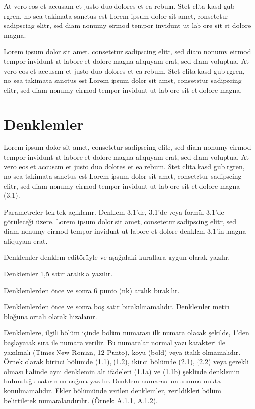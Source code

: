 At vero eos et accusam et justo duo dolores et ea rebum. Stet clita kasd gub rgren, no sea takimata sanctus est Lorem ipsum dolor sit amet, consetetur sadipscing elitr, sed diam nonumy eirmod tempor invidunt ut lab ore sit et dolore magna.

Lorem ipsum dolor sit amet, consetetur sadipscing elitr, sed diam nonumy eirmod tempor invidunt ut labore et dolore magna aliquyam erat, sed diam voluptua. At vero eos et accusam et justo duo dolores et ea rebum. Stet clita kasd gub rgren, no sea takimata sanctus est Lorem ipsum dolor sit amet, consetetur sadipscing elitr, sed diam nonumy eirmod tempor invidunt ut lab ore sit et dolore magna.

\section{Denklemler}
Lorem ipsum dolor sit amet, consetetur sadipscing elitr, sed diam nonumy eirmod tempor invidunt ut labore et dolore magna aliquyam erat, sed diam voluptua. At vero eos et accusam et justo duo dolores et ea rebum. Stet clita kasd gub rgren, no sea takimata sanctus est Lorem ipsum dolor sit amet, consetetur sadipscing elitr, sed diam nonumy eirmod tempor invidunt ut lab ore sit et dolore magna (3.1).

\begin{denklem}
  \label{denk:3.1}
\end{denklem}
\begin{denklem}
  \label{denk:3.2}
\end{denklem}
Parametreler tek tek açıklanır. Denklem 3.1’de, 3.1’de veya formül 3.1’de görüleceği üzere. Lorem ipsum dolor sit amet, consetetur sadipscing elitr, sed diam nonumy eirmod tempor invidunt ut labore et dolore denklem 3.1’in magna aliquyam erat.

Denklemler denklem editörüyle ve aşağıdaki kurallara uygun olarak yazılır.

Denklemler 1,5 satır aralıkla yazılır.

Denklemlerden önce ve sonra 6 punto (nk) aralık bırakılır.

Denklemlerden önce ve sonra boş satır bırakılmamalıdır. Denklemler metin bloğuna ortalı olarak hizalanır.

Denklemlere, ilgili bölüm içinde bölüm numarası ilk numara olacak şekilde, 1’den başlayarak sıra ile numara verilir. Bu numaralar normal yazı karakteri ile yazılmalı (Times New Roman, 12 Punto), koyu (bold) veya italik olmamalıdır. Örnek olarak birinci bölümde (1.1), (1.2), ikinci bölümde (2.1), (2.2) veya gerekli olması halinde aynı denklemin alt ifadeleri (1.1a) ve (1.1b) şeklinde denklemin bulunduğu satırın en sağına yazılır. Denklem numarasının sonuna nokta konulmamalıdır. Ekler bölümünde verilen denklemler, verildikleri bölüm belirtilerek numaralandırılır. (Örnek: A.1.1, A.1.2).

